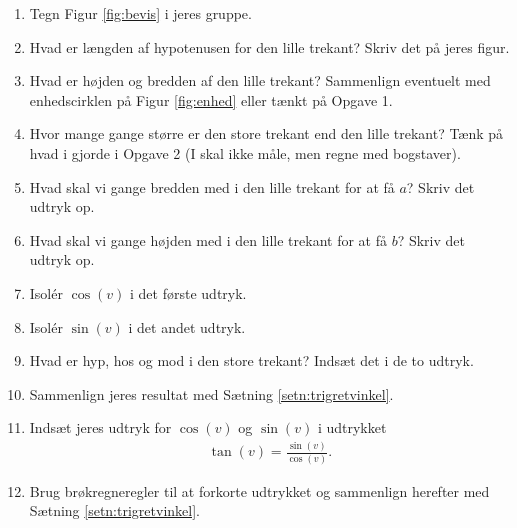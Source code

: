 \begin{enumerate}[label=\roman*)]
	\item Tegn Figur \ref{fig:bevis} i jeres gruppe. 
	\item Hvad er længden af hypotenusen for den lille trekant? Skriv det på jeres figur.
	\item Hvad er højden og bredden af den lille trekant? Sammenlign eventuelt med enhedscirklen på Figur \ref{fig:enhed} eller tænkt på Opgave 1. 
	\item Hvor mange gange større er den store trekant end den lille trekant? Tænk på hvad i gjorde i Opgave 2 (I skal ikke måle, men regne med bogstaver).
	\item Hvad skal vi gange bredden med i den lille trekant for at få $a$? Skriv det udtryk op.
	\item Hvad skal vi gange højden med i den lille trekant for at få $b$? Skriv det udtryk op.
	\item Isolér $\cos(v)$ i det første udtryk. 
	\item Isolér $\sin(v)$ i det andet udtryk. 
	\item Hvad er hyp, hos og mod i den store trekant? Indsæt det i de to udtryk. 
	\item Sammenlign jeres resultat med Sætning \ref{setn:trigretvinkel}.
	\item Indsæt jeres udtryk for $\cos(v)$ og $\sin(v)$ i udtrykket
	\begin{align*}
		\tan(v) = \frac{\sin(v)}{\cos(v)}.	
	\end{align*}	 
	\item Brug brøkregneregler til at forkorte udtrykket og sammenlign herefter med Sætning \ref{setn:trigretvinkel}.
\end{enumerate}
